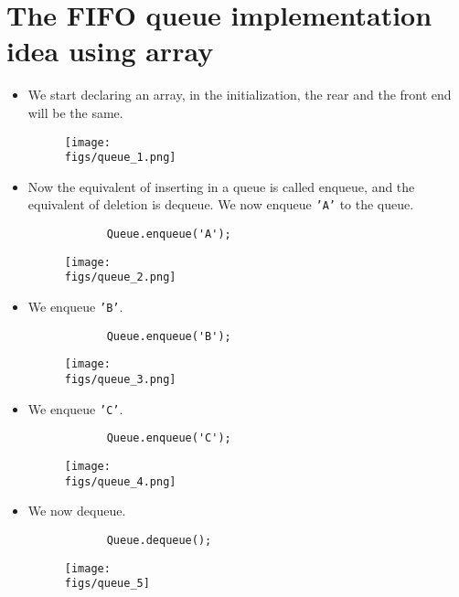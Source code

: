 \section{The FIFO queue implementation idea using array}
\begin{itemize}
    \item We start declaring an array, in the initialization, the rear and the front end will be the same. 
        \begin{figure}[H]
            \centering
            \texttt{[image: \\figs/queue\_1.png]} 
        \end{figure}
    
    \item Now the equivalent of inserting in a queue is called enqueue, and the equivalent of deletion is dequeue. We now enqueue \texttt{'A'} to the queue.
        \begin{verbatim}
            Queue.enqueue('A');
        \end{verbatim}
        \begin{figure}[H]
            \centering
            \texttt{[image: \\figs/queue\_2.png]} 
        \end{figure}
    
    \item We enqueue \texttt{'B'}.
        \begin{verbatim}
            Queue.enqueue('B');
        \end{verbatim}
        \begin{figure}[H]
            \centering
            \texttt{[image: \\figs/queue\_3.png]} 
        \end{figure}
    
    \item We enqueue \texttt{'C'}.
        \begin{verbatim}
            Queue.enqueue('C');
        \end{verbatim}
        \begin{figure}[H]
            \centering
            \texttt{[image: \\figs/queue\_4.png]} 
        \end{figure}
    
    \item We now dequeue.
        \begin{verbatim}
            Queue.dequeue();
        \end{verbatim}
        \begin{figure}[H]
            \centering
            \texttt{[image: \\figs/queue\_5]} 
        \end{figure}
        

\end{itemize}
